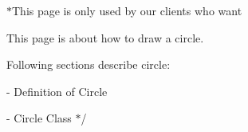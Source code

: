 $\ast$\+This page is only used by our clients who want
\begin{DoxyItemize}
\item This page is about how to draw a circle.
\item Following sections describe circle\+:
\item -\/ Definition of Circle
\item -\/ Circle Class $\ast$/ 
\end{DoxyItemize}